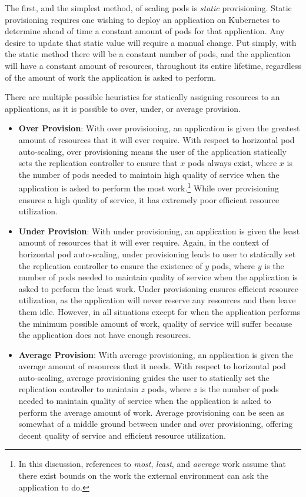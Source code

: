 The first, and the simplest method, of scaling pods is \textit{static}
provisioning. Static provisioning requires one wishing to deploy an application on
Kubernetes to determine ahead of time a constant amount of pods for that
application. Any desire to update that static value will require a manual
change. Put simply, with the static method there will be a constant number of
pods, and the application will have a constant amount of resources, throughout
its entire lifetime, regardless of the amount of work the application is asked
to perform.

There are multiple possible heuristics for statically assigning resources to an
applications, as it is possible to over, under, or average provision.

\begin{itemize}
  \item \textbf{Over Provision}: With over provisioning, an application is given
    the greatest amount of resources that it will ever require. With respect to
    horizontal pod auto-scaling, over provisioning means the user of the
    application statically sets the replication controller to ensure that $x$ pods
    always exist, where $x$ is the number of pods needed to
    maintain high quality of service when the application is
    asked to perform the most work.\footnote{In this discussion, references to
    \textit{most}, \textit{least}, and \textit{average} work assume that there
    exist bounds on the work the external environment can ask the application to
    do.} While over provisioning ensures a high quality of service, it has extremely
    poor efficient resource utilization.

  \item \textbf{Under Provision}: With under provisioning, an application is
    given the least amount of resources that it will ever require. Again, in the
    context of horizontal pod auto-scaling, under provisioning leads to user to
    statically set the replication controller to ensure the existence of
    $y$ pods, where $y$ is the number of pods needed to maintain quality of
    service when the application is asked to perform the least work. Under
    provisioning ensures efficient resource utilization, as the application will
    never reserve any resources and then leave them idle. However, in all
    situations except for when the application performs the minimum possible
    amount of work, quality of service will suffer because the application does
    not have enough resources.

  \item \textbf{Average Provision}: With average provisioning, an application is
    given the average amount of resources that it needs. With respect to
    horizontal pod auto-scaling, average provisioning guides the user to
    statically set the replication controller to maintain $z$ pods, where
    $z$ is the number of pods needed to maintain quality of service when the
    application is asked to perform the average amount of work. Average
    provisioning can be seen as somewhat of a middle ground between under and
    over provisioning, offering decent quality of service and efficient resource
    utilization.
\end{itemize}

